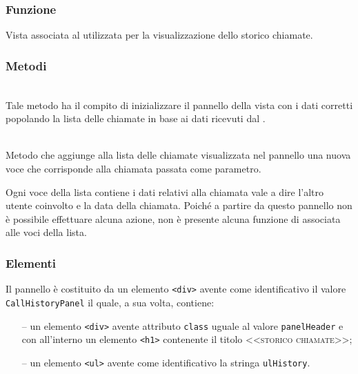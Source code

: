 \subsubsection*{Funzione}
Vista associata al   utilizzata per la visualizzazione dello storico chiamate.

\subsubsection*{Metodi}
\begin{description}
  \item{}\\
  Tale metodo ha il compito di inizializzare il pannello della vista con i dati corretti popolando la lista delle chiamate in base ai dati ricevuti dal .
  
  \item{}\\
  Metodo che aggiunge alla lista delle chiamate visualizzata nel pannello una nuova voce che corrisponde alla chiamata passata come parametro.
  
  Ogni voce della lista contiene i dati relativi alla chiamata vale a dire l'altro utente coinvolto e la data della chiamata. Poiché a partire da questo pannello non è possibile effettuare alcuna azione, non è presente alcuna funzione di  associata alle voci della lista.
  
\end{description}

\subsubsection*{Elementi}
Il pannello è costituito da un elemento \verb'<div>' avente come identificativo il valore \verb'CallHistoryPanel' il quale, a sua volta, contiene:
\begin{itemize}
  \item[--] un elemento \verb'<div>' avente attributo \verb'class' uguale al valore \verb'panelHeader' e con all'interno un elemento \verb'<h1>' contenente il titolo \textsc{<<storico chiamate>>};
  \item[--] un elemento \verb'<ul>' avente come identificativo la stringa \verb'ulHistory'.
\end{itemize}

